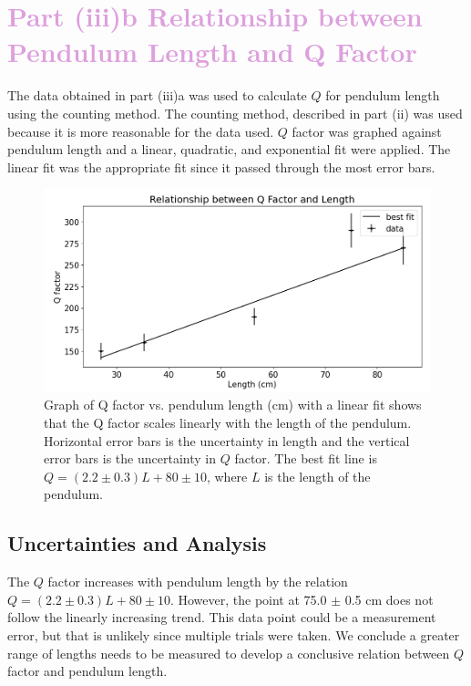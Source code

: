 \documentclass[notitlepage, twocolumn, 12pt]{article}
\begin{document}
    \section*{\textcolor{Plum}{Part (iii)b Relationship between Pendulum Length and Q Factor}}
    \color{Plum}
    The data obtained in part (iii)a was used to calculate $Q$ for pendulum length using the counting method. The counting method, described in part (ii) was used because it is more reasonable for the data used.  $Q$ factor was graphed against pendulum length and a linear, quadratic, and exponential fit were applied. The linear fit was the appropriate fit since it passed through the most error bars. 
    \begin{figure}[H]
        \includegraphics[width=\linewidth]{qfactorvslength.png}
        \caption{\color{Plum} Graph of Q factor vs. pendulum length (cm) with a linear fit shows that the Q factor scales linearly with the length of the pendulum. Horizontal error bars is the uncertainty in length and the vertical error bars is the uncertainty in $Q$ factor. The best fit line is $Q = (2.2 \pm 0.3)L + 80 \pm 10$, where $L$ is the length of the pendulum.  }
        \label{fig:qfactorvslength}
    \end{figure} 

    \subsection*{Uncertainties and Analysis}
    The $Q$ factor increases with pendulum length by the relation $Q = (2.2 \pm 0.3)L + 80 \pm 10$. However, the point at  75.0 $\pm$ 0.5 cm does not follow the linearly increasing trend. This data point could be a measurement error, but that is unlikely since multiple trials were taken. We conclude a greater range of lengths needs to be measured to develop a conclusive relation between $Q$ factor and pendulum length.  
\end{document}
